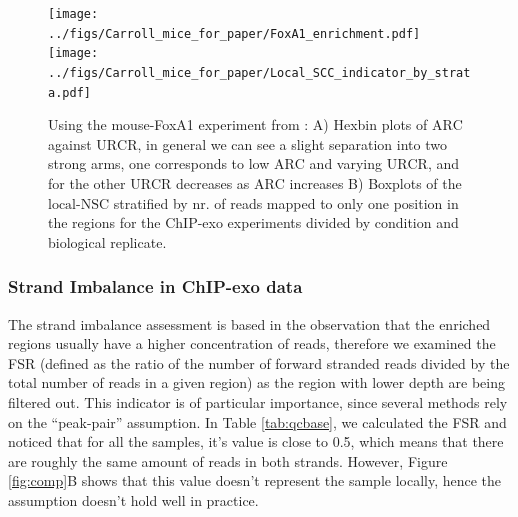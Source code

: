 \documentclass[11pt]{article}\usepackage[]{graphicx}\usepackage[]{color}
\begin{document}
\begin{figure}[H]
  \centering
  \texttt{[image: ../figs/Carroll\_mice\_for\_paper/FoxA1\_enrichment.pdf]}
  \texttt{[image: ../figs/Carroll\_mice\_for\_paper/Local\_SCC\_indicator\_by\_strata.pdf]}
  \caption{Using the mouse-FoxA1 experiment from \cite{exoillumina}:
    A) Hexbin plots of $\mbox{ARC}$ against $\mbox{URCR}$, in general
    we can see a slight separation into two strong arms, one
    corresponds to low $\mbox{ARC}$ and varying $\mbox{URCR}$, and for
    the other $\mbox{URCR}$ decreases as $\mbox{ARC}$ increases B)
    Boxplots of the $\mbox{local-NSC}$ stratified by nr. of reads
    mapped to only one position in the regions for the ChIP-exo
    experiments divided by condition and biological replicate.}
  \label{fig:enrich}
\end{figure}



\subsubsection{Strand Imbalance in ChIP-exo data}
\label{sec:strand_imbalance}

The strand imbalance assessment is based in the observation that the
enriched regions usually have a higher concentration of reads,
therefore we examined the FSR (defined as the ratio of the number of
forward stranded reads divided by the total number of reads in a given
region) as the region with lower depth are being filtered out. This
indicator is of particular importance, since several methods rely on
the ``peak-pair'' assumption. In Table \ref{tab:qcbase}, we calculated
the FSR and noticed that for all the samples, it's value is close to
0.5, which means that there are roughly the same amount of reads in
both strands. However, Figure \ref{fig:comp}B shows that this value
doesn't represent the sample locally, hence the assumption doesn't
hold well in practice.
\end{document}
